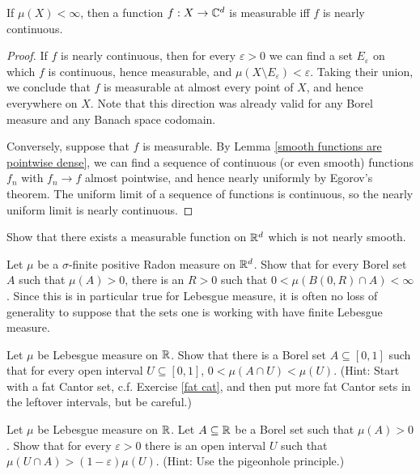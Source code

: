 \begin{theorem}[Luzin]
If $\mu(X) < \infty$, then a function $f: X \to \mathbb{C}^d$ is measurable iff $f$ is nearly continuous.
\end{theorem}
\begin{proof}
If $f$ is nearly continuous, then for every $\varepsilon > 0$ we can find a set $E_\varepsilon$ on which $f$ is continuous, hence measurable, and $\mu(X \setminus E_\varepsilon) < \varepsilon$.
Taking their union, we conclude that $f$ is measurable at almost every point of $X$, and hence everywhere on $X$.
Note that this direction was already valid for any Borel measure and any Banach space codomain.

Conversely, suppose that $f$ is measurable.
By Lemma \ref{smooth functions are pointwise dense}, we can find a sequence of continuous (or even smooth) functions $f_n$ with $f_n \to f$ almost pointwise, and hence nearly uniformly by Egorov's theorem.
The uniform limit of a sequence of functions is continuous, so the nearly uniform limit is nearly continuous.
\end{proof}

\begin{exercise}
Show that there exists a measurable function on $\mathbb{R}^d$ which is not nearly smooth.
\end{exercise}

\begin{exercise}
Let $\mu$ be a $\sigma$-finite positive Radon measure on $\mathbb{R}^d$.
Show that for every Borel set $A$ such that $\mu(A) > 0$, there is an $R > 0$ such that $0 < \mu(B(0, R) \cap A) < \infty$.
Since this is in particular true for Lebesgue measure, it is often no loss of generality to suppose that the sets one is working with have finite Lebesgue measure.
\end{exercise}

\begin{exercise}
Let $\mu$ be Lebesgue measure on $\mathbb{R}$.
Show that there is a Borel set $A \subseteq [0, 1]$ such that for every open interval $U \subseteq [0, 1]$, $0 < \mu(A \cap U) < \mu(U)$.
(Hint: Start with a fat Cantor set, c.f. Exercise \ref{fat cat}, and then put more fat Cantor sets in the leftover intervals, but be careful.)
\end{exercise}

\begin{exercise}
Let $\mu$ be Lebesgue measure on $\mathbb{R}$.
Let $A \subseteq \mathbb{R}$ be a Borel set such that $\mu(A) > 0$.
Show that for every $\varepsilon > 0$ there is an open interval $U$ such that $\mu(U \cap A) > (1 - \varepsilon)\mu(U)$.
(Hint: Use the pigeonhole principle.)
\end{exercise}

